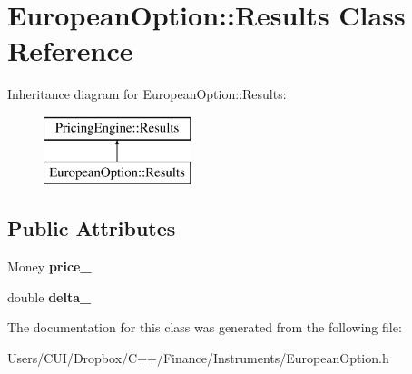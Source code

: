 \hypertarget{class_european_option_1_1_results}{}\section{European\+Option\+:\+:Results Class Reference}
\label{class_european_option_1_1_results}
Inheritance diagram for European\+Option\+:\+:Results\+:\begin{figure}[H]
\begin{center}
\leavevmode
\includegraphics[height=2.000000cm]{class_european_option_1_1_results}
\end{center}
\end{figure}
\subsection*{Public Attributes}
\begin{DoxyCompactItemize}
\item 
\hypertarget{class_european_option_1_1_results_a517b87143fda866b135b21051dc4fd6c}{}\label{class_european_option_1_1_results_a517b87143fda866b135b21051dc4fd6c} 
Money {\bfseries price\+\_\+}
\item 
\hypertarget{class_european_option_1_1_results_a3e9ddb58f8e1f69b972bfed5e893414b}{}\label{class_european_option_1_1_results_a3e9ddb58f8e1f69b972bfed5e893414b} 
double {\bfseries delta\+\_\+}
\end{DoxyCompactItemize}


The documentation for this class was generated from the following file\+:\begin{DoxyCompactItemize}
\item 
Users/\+C\+U\+I/\+Dropbox/\+C++/\+Finance/\+Instruments/European\+Option.\+h\end{DoxyCompactItemize}
